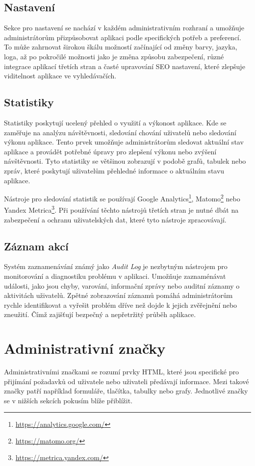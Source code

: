 \subsection{Nastavení}
\label{subsec:admin-elements-settings}
Sekce pro nastavení se nachází v každém administrativním rozhraní a umožňuje administrátorům přizpůsobovat aplikaci podle specifických potřeb a preferencí. To může zahrnovat širokou škálu možností začínající od změny barvy, jazyka, loga, až po pokročilé možnosti jako je změna způsobu zabezpečení, různé integrace aplikací třetích stran a časté upravování SEO nastavení, které zlepšuje viditelnost aplikace ve vyhledávačích.

\subsection{Statistiky}
\label{subsec:admin-elements-statistics}
Statistiky poskytují ucelený přehled o využití a výkonost aplikace. Kde se zaměřuje na analýzu návštěvnosti, sledování chování uživatelů nebo sledování výkonu aplikace. Tento prvek umožňuje administrátorům sledovat aktuální stav aplikace a provádět potřebné úpravy pro zlepšení výkonu nebo zvýšení návštěvnosti.
Tyto statistiky se většinou zobrazují v podobě grafů, tabulek nebo zpráv, které poskytují uživatelům přehledné informace o aktuálním stavu aplikace.

Nástroje pro sledování statistik se používají Google Analytics\footnote[4]{\url{https://analytics.google.com/}}, Matomo\footnote[5]{\url{https://matomo.org/}} nebo Yandex Metrica\footnote[6]{\url{https://metrica.yandex.com/}}. Při používání těchto nástrojů třetích stran je nutné dbát na zabezpečení a ochranu uživatelských dat, které tyto nástroje zpracovávají.

\subsection{Záznam akcí}
\label{subsec:admin-elements-logs}
Systém zaznamenávání známý jako \textit{Audit Log} je nezbytným nástrojem pro monitorování a diagnostiku problému v aplikaci. Umožňuje zaznaménávat události, jako jsou chyby, varování, informační zprávy nebo auditní záznamy o aktivitách uživatelů. Zpětné zobrazování záznamů pomáhá administrátorům rychle identifikovat a vyřešit problém dříve než dojde k jejich zvěřejnění nebo zneužití. Čímž zajišťují bezpečný a nepřetržitý průběh aplikace.

\section{Administrativní značky}
\label{sec:admin-tags}
Administrativními značkami se rozumí prvky HTML, které jsou specifické pro přijímání požadavků od uživatele nebo uživateli předávají informace. Mezi takové značky patří například formuláře, tlačítka, tabulky nebo grafy. Jednotlivé značky se v nižších sekcích pokusím blíže přiblížit.

